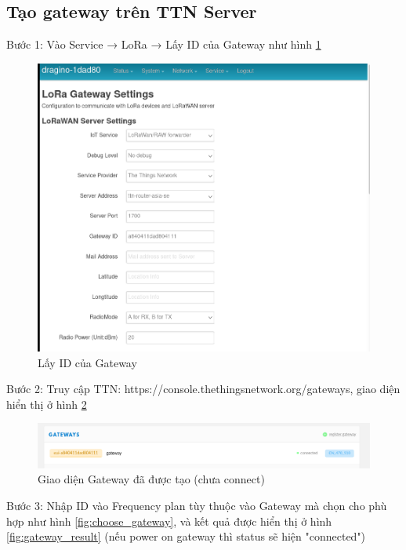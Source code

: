\subsection{Tạo gateway trên TTN Server}
\begin{description}
    \item Bước 1: Vào Service → LoRa → Lấy ID của Gateway như hình \ref{fig:get_gateway_id}
    \begin{figure}[H]
        \centering
        \includegraphics[width=\textwidth]{images/Quanh/Gateway_ID.png}
        \caption{Lấy ID của Gateway}
        \label{fig:get_gateway_id}
    \end{figure}
    \item Bước 2: Truy cập TTN: https://console.thethingsnetwork.org/gateways, giao diện hiển thị ở hình \ref{fig:gateway_console}
    \begin{figure}[H]
        \centering
        \includegraphics[width=\textwidth]{images/Quanh/Gateway_console.png}
        \caption{Giao diện Gateway đã được tạo (chưa connect)}
        \label{fig:gateway_console}
    \end{figure}
    \item Bước 3: Nhập ID vào Frequency plan tùy thuộc vào Gateway mà chọn cho phù hợp như hình \ref{fig:choose_gateway}, và kết quả được hiển thị ở hình \ref{fig:gateway_result} (nếu power on gateway thì status sẽ hiện "connected")

\end{description}
